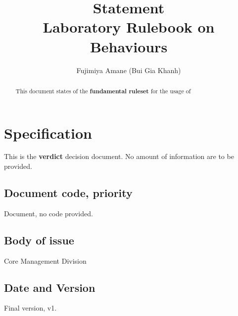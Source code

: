 \documentclass[10pt,a4paper]{article}
\title{\textbf{Statement} \\ Laboratory Rulebook on Behaviours} %
\author{Fujimiya Amane (Bui Gia Khanh)} %
\affiliation{} %
\begin{document}
\maketitle

\begin{abstract}
    \noindent
    This document states of the \textbf{fundamental ruleset} for the usage of 
\end{abstract}

\vspace{2.5cm}



\thispagestyle{firstpage}

\pagebreak


\newgeometry{} %

\section{Specification}
\label{sec:spec}

This is the \textbf{verdict} decision document. No amount of information are to be provided. 
\subsection{Document code, priority}


Document, no code provided.

\subsection{Body of issue}

Core Management Division

\subsection{Date and Version}


Final version, v1. 
\end{document}
